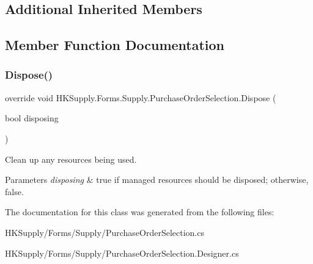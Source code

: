 \subsection*{Additional Inherited Members}


\subsection{Member Function Documentation}
\mbox{\label{class_h_k_supply_1_1_forms_1_1_supply_1_1_purchase_order_selection_a6e9e2c2955ebc43f9f9eace05ce13a80}} 
\subsubsection{\texorpdfstring{Dispose()}{Dispose()}}
{\footnotesize\ttfamily override void H\+K\+Supply.\+Forms.\+Supply.\+Purchase\+Order\+Selection.\+Dispose (\begin{DoxyParamCaption}\item[{bool}]{disposing }\end{DoxyParamCaption})\hspace{0.3cm}{\ttfamily [protected]}}



Clean up any resources being used. 


\begin{DoxyParams}{Parameters}
{\em disposing} & true if managed resources should be disposed; otherwise, false.\\
\hline
\end{DoxyParams}


The documentation for this class was generated from the following files\+:\begin{DoxyCompactItemize}
\item 
H\+K\+Supply/\+Forms/\+Supply/Purchase\+Order\+Selection.\+cs\item 
H\+K\+Supply/\+Forms/\+Supply/Purchase\+Order\+Selection.\+Designer.\+cs\end{DoxyCompactItemize}
